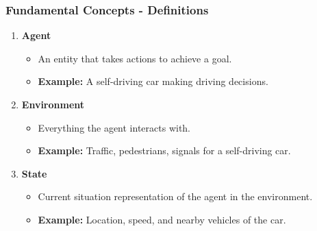 \documentclass[aspectratio=169]{beamer}
\begin{document}
\begin{frame}[fragile]
    \frametitle{Fundamental Concepts - Definitions}
    \begin{enumerate}
        \item \textbf{Agent}
          \begin{itemize}
              \item An entity that takes actions to achieve a goal.
              \item \textbf{Example:} A self-driving car making driving decisions.
          \end{itemize}
          
        \item \textbf{Environment}
          \begin{itemize}
              \item Everything the agent interacts with.
              \item \textbf{Example:} Traffic, pedestrians, signals for a self-driving car.
          \end{itemize}
          
        \item \textbf{State}
          \begin{itemize}
              \item Current situation representation of the agent in the environment.
              \item \textbf{Example:} Location, speed, and nearby vehicles of the car.
          \end{itemize}
    \end{enumerate}
\end{frame}
\end{document}
